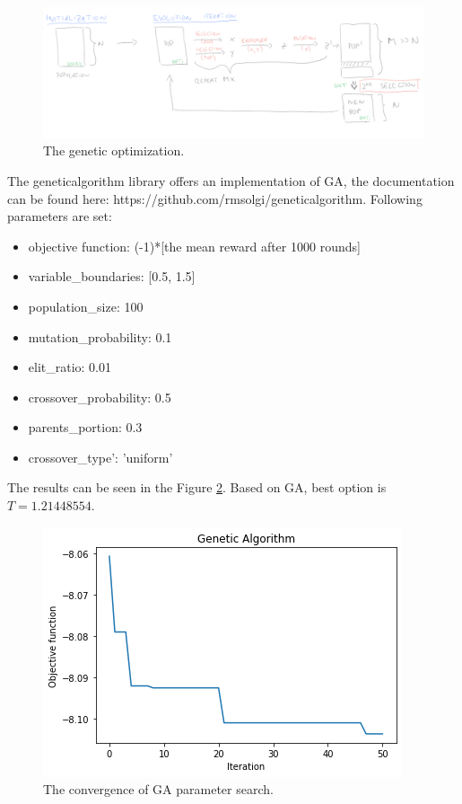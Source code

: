 \documentclass[11pt,american,czech]{article}
\begin{document}
\begin{figure}[h]
	\centering
	\includegraphics[scale=0.5]{go_overview.png}
	\caption{The genetic optimization.}\label{fig::ga}
\end{figure}

 The geneticalgorithm library offers an implementation of GA, the documentation can be found here: https://github.com/rmsolgi/geneticalgorithm. Following parameters are set:
 \begin{itemize}
 	\item objective function: (-1)*[the mean reward after 1000 rounds]
 	\item variable\_boundaries: [0.5, 1.5]
 	\item population\_size: 100
 	\item mutation\_probability: 0.1
 	\item elit\_ratio: 0.01
 	\item crossover\_probability: 0.5
 	\item parents\_portion: 0.3
 	\item crossover\_type': 'uniform'
 \end{itemize}

The results can be seen in the Figure \ref{fig::gaO}. Based on GA, best option is $T=1.21448554$. 

\begin{figure}[h]
	\centering
	\includegraphics[scale=0.6]{ga1.png}
	\caption{The convergence of GA parameter search.}\label{fig::gaO}
\end{figure}
\end{document}

